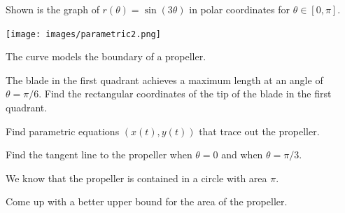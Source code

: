 \documentclass{workbook}
\begin{document}
\begin{slide}
	\question

		Shown is the graph of $\displaystyle
		r(\theta)=\sin(3\theta)
		$
		in polar coordinates
		for $\theta\in[0,\pi]$.
		\begin{center}
	\texttt{[image: images/parametric2.png]}
		\end{center}

	
	The curve models the boundary of a propeller.

	\begin{parts}
		\item The blade in the first quadrant achieves a maximum length at 
		an angle of $\theta =\pi/6$. Find the rectangular coordinates of
		the tip of the blade in the first quadrant.

		\item Find parametric equations $(x(t), y(t))$ that trace out the 
		propeller.

		\item Find the tangent line to the propeller when $\theta=0$
		and when $\theta =\pi/3$.

		\item We know that the propeller is contained in 
		a circle with area $\pi$.

		Come up with a better upper bound for the area of the 
		propeller.		
	\end{parts}
\end{slide}
\end{document}
